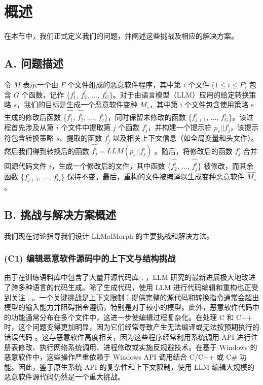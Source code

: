 \chapter{概述}
在本节中，我们正式定义我们的问题，并阐述这些挑战及相应的解决方案。

\section{A. 问题描述}
令 $M$ 表示一个由 $F$ 个文件组成的恶意软件程序，其中第 $i$ 个文件 ($1 ≤ i ≤ F$) 包含 $G$ 个函数，记作 \{$f_{1}^{i}$, $f_{2}^{i}$, ..., $f_{G}^{i}$\}。对于由语言模型（LLM）应用的给定转换策略 $s$，我们的目标是生成一个恶意软件变种 $M_{s}$，其中第 i 个文件包含使用策略 s 生成的修改后函数 \{$\hat{f_{1}^{i}}$, $\hat{f_{2}^{i}}$, ..., $\hat{f_{j}^{i}}$\}，同时保留未修改的函数 \{$f_{j+1}^{i}$, ..., $f_{G}^{i}$\}。该过程首先涉及从第 $i$ 个文件中提取第 $j$ 个函数 $f_{j}^{i}$，并构建一个提示符 $p_{s}||f_{j}^{i}$，该提示符包含转换策略 $s$、提取的函数 $f_{j}^{i}$ 以及相关上下文信息（如全局变量和头文件）。然后我们得到转换后的函数 $\hat{f_{j}^{i}} = LLM(p_{s}||f_{j}^{i})$ 。随后，将修改后的函数 $f_{j}^{i}$ 合并回源代码文件 $i$，生成一个修改后的文件，其中函数 \{$\hat{f_{2}^{i}}$, ..., $\hat{f_{j}^{i}}$\} 被修改，而其余函数 \{$f_{j+1}^{i}$, ..., $f_{G}^{i}$\} 保持不变。最后，重构的文件被编译以生成变种恶意软件 $\hat{M_{s}}$。

\section{B. 挑战与解决方案概述}
我们现在讨论指导我们设计 LLMalMorph 的主要挑战和解决方法。

\subsection{(C1) 编辑恶意软件源码中的上下文与结构挑战}
由于在训练语料库中包含了大量开源代码库 \parencite{Roziere2023,Zhu2024,Lozhkov2024}, \parencite{Huang2024}，LLM 研究的最新进展极大地改进了跨多种语言的代码生成。除了生成代码，使用 LLM 进行代码编辑和重构也正受到关注 \parencite{Cassano2024}, \parencite{Guo2024}。一个关键挑战是上下文限制：提供完整的源代码和转换指令通常会超出模型的输入能力并阻碍指令遵循，特别是对于较小的模型。此外，恶意软件代码中的功能通常分布在多个文件中，这进一步使编辑过程复杂化。在处理 C 和 C++ 时，这个问题变得更加明显，因为它们经常导致产生无法编译或无法按预期执行的错误代码 \parencite{Buscemi2023}。这与恶意软件高度相关，因为这些程序经常利用系统调用 API 进行注册表修改、执行网络系统调用、进程修改或实施反规避技术。在基于 Windows 的恶意软件中，这些操作严重依赖于 Windows API 调用结合 C/C++ 或 C\# 功能。因此，鉴于原生系统 API 的复杂性和上下文限制，使用 LLM 编辑大规模的恶意软件源代码仍然是一个重大挑战。

